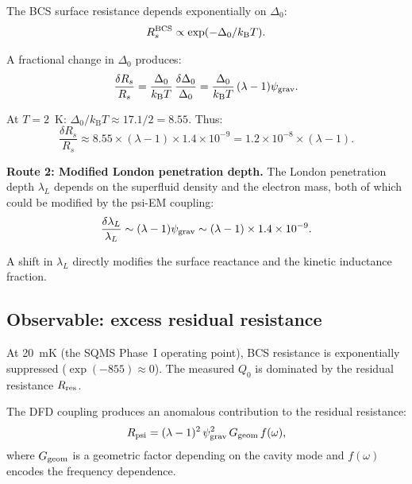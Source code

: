 \documentclass[11pt]{article}
\newcommand{\lam}{\lambda}
\newcommand{\ee}[1]{\times 10^{#1}}
\newcommand{\kB}{k_{\mathrm{B}}}
\newcommand{\psigrav}{\psi_{\rm grav}}
\theoremstyle{definition}
\theoremstyle{remark}
\begin{document}
The BCS surface resistance depends exponentially on $\Delta_0$:
\begin{equation}
R_s^{\rm BCS} \propto \exp(-\Delta_0/\kB T).
\end{equation}

A fractional change in $\Delta_0$ produces:
\begin{equation}
\frac{\delta R_s}{R_s} = \frac{\Delta_0}{\kB T}\,
\frac{\delta\Delta_0}{\Delta_0}
= \frac{\Delta_0}{\kB T}\,(\lam-1)\psigrav.
\end{equation}

At $T = 2$~K: $\Delta_0/\kB T \approx 17.1/2 = 8.55$. Thus:
\begin{equation}
\frac{\delta R_s}{R_s} \approx 8.55\times(\lam-1)\times1.4\ee{-9}
= 1.2\ee{-8}\times(\lam-1).
\label{eq:Rs_shift}
\end{equation}

\textbf{Route 2: Modified London penetration depth.}
The London penetration depth $\lambda_L$ depends on the superfluid
density and the electron mass, both of which could be modified by
the psi-EM coupling:
\begin{equation}
\frac{\delta\lambda_L}{\lambda_L} \sim (\lam-1)\psigrav
\sim (\lam-1)\times 1.4\ee{-9}.
\end{equation}

A shift in $\lambda_L$ directly modifies the surface reactance and
the kinetic inductance fraction.

\subsection{Observable: excess residual resistance}

At 20~mK (the SQMS Phase~I operating point), BCS resistance is
exponentially suppressed ($\exp(-855) \approx 0$). The measured
$Q_0$ is dominated by the residual resistance $R_{\rm res}$.

The DFD coupling produces an anomalous contribution to the residual
resistance:
\begin{equation}
R_{\rm psi} = (\lam-1)^2\,\psigrav^2\,G_{\rm geom}\,f(\omega),
\label{eq:R_psi}
\end{equation}
where $G_{\rm geom}$ is a geometric factor depending on the cavity mode
and $f(\omega)$ encodes the frequency dependence.
\end{document}
